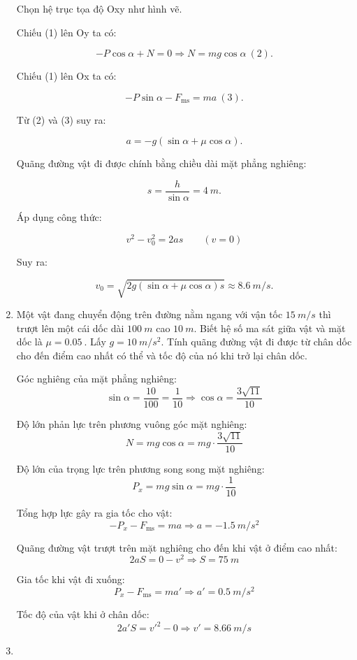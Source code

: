 \begin{enumerate}[label=\bfseries Bài \arabic*:]
{	Chọn hệ trục tọa độ Oxy như hình vẽ.
	
	Chiếu (1) lên Oy ta có:
	
	$$ - P \cos \alpha + N =0 \Rightarrow N = mg \cos \alpha\ (2).$$
	
	Chiếu (1) lên Ox ta có: 
	
	$$ - P \sin \alpha - F_\text{ms} = ma\ (3).$$
	
	Từ (2) và (3) suy ra:
	
	$$a = -g(\sin \alpha + \mu \cos \alpha).$$
	
	Quãng đường vật đi được chính bằng chiều dài mặt phẳng nghiêng:
	
	$$s = \dfrac{h}{\sin \alpha } = \SI{4}{m}.$$
	
	Áp dụng công thức:
	
	$$v^2 - v_0^2 = 2as\qquad (v=0)$$ 
	
	Suy ra:
	
	$$v_0 = \sqrt{2g(\sin \alpha + \mu \cos \alpha)s} \approx \SI{8,6}{m/s}.$$
}

	
\item {}


{Một vật đang chuyển động trên đường nằm ngang với vận tốc $\SI{15}{m/s}$ thì trượt lên một cái dốc dài $\SI{100}{m}$ cao $\SI{10}{m}$. Biết hệ số ma sát giữa vật và mặt dốc là $\mu = \SI{0.05}{}$. Lấy $g=\SI{10}{m/s^2}$. Tính quãng đường vật đi được từ chân dốc cho đến điểm cao nhất có thể và tốc độ của nó khi trở lại chân dốc.
}

\hideall
{Góc nghiêng của mặt phẳng nghiêng:
	$$\sin \alpha = \dfrac{10}{100} = \dfrac{1}{10} \Rightarrow \cos \alpha = \dfrac{3\sqrt{11}}{10}$$
	
	Độ lớn phản lực trên phương vuông góc mặt nghiêng:
	$$N=mg \cos \alpha = mg \cdot \dfrac{3\sqrt{11}}{10}$$
	
	Độ lớn của trọng lực trên phương song song mặt nghiêng:
	$$P_x = mg \sin \alpha = mg \cdot \dfrac{1}{10}$$
	
	Tổng hợp lực gây ra gia tốc cho vật:
	$$-P_x - F_\text{ms} = ma \Rightarrow a =\SI{-1.5}{m/s^2} $$
	
	Quãng đường vật trượt trên mặt nghiêng cho đến khi vật ở điểm cao nhất:
	$$2aS = 0 -v^2 \Rightarrow S = \SI{75}{m}$$
	
	Gia tốc khi vật đi xuống:
	$$P_x - F_\text{ms} = ma' \Rightarrow a' = \SI{0.5}{m/s^2}$$
	
	Tốc độ của vật khi ở chân dốc:
	$$2a' S = v'^2 - 0 \Rightarrow v' = \SI{8.66}{m/s}$$
}

\item {}



\end{enumerate}
